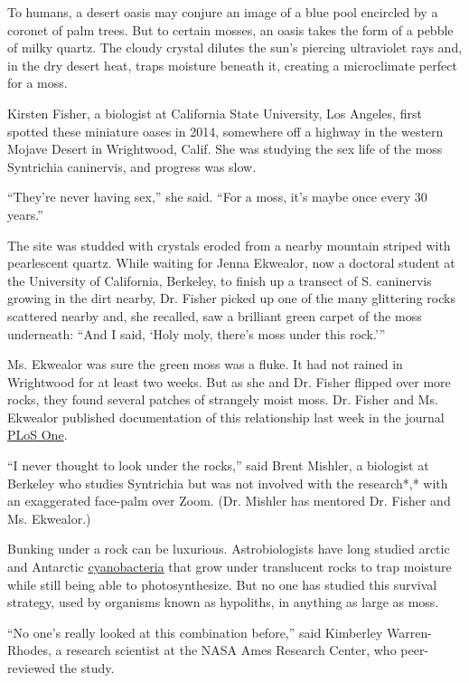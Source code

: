 To humans, a desert oasis may conjure an image of a blue pool encircled
by a coronet of palm trees. But to certain mosses, an oasis takes the
form of a pebble of milky quartz. The cloudy crystal dilutes the sun's
piercing ultraviolet rays and, in the dry desert heat, traps moisture
beneath it, creating a microclimate perfect for a moss.

Kirsten Fisher, a biologist at California State University, Los Angeles,
first spotted these miniature oases in 2014, somewhere off a highway in
the western Mojave Desert in Wrightwood, Calif. She was studying the sex
life of the moss Syntrichia caninervis, and progress was slow.

``They're never having sex,'' she said. ``For a moss, it's maybe once
every 30 years.''

The site was studded with crystals eroded from a nearby mountain striped
with pearlescent quartz. While waiting for Jenna Ekwealor, now a
doctoral student at the University of California, Berkeley, to finish up
a transect of S. caninervis growing in the dirt nearby, Dr. Fisher
picked up one of the many glittering rocks scattered nearby and, she
recalled, saw a brilliant green carpet of the moss underneath: ``And I
said, `Holy moly, there's moss under this rock.'''

Ms. Ekwealor was sure the green moss was a fluke. It had not rained in
Wrightwood for at least two weeks. But as she and Dr. Fisher flipped
over more rocks, they found several patches of strangely moist moss. Dr.
Fisher and Ms. Ekwealor published documentation of this relationship
last week in the journal
\href{https://journals.plos.org/plosone/article?id=10.1371/journal.pone.0235928}{PLoS
One}.

``I never thought to look under the rocks,'' said Brent Mishler, a
biologist at Berkeley who studies Syntrichia but was not involved with
the research*,* with an exaggerated face-palm over Zoom. (Dr. Mishler
has mentored Dr. Fisher and Ms. Ekwealor.)

Bunking under a rock can be luxurious. Astrobiologists have long studied
arctic and Antarctic
\href{https://www.nature.com/articles/431414a}{cyanobacteria} that grow
under translucent rocks to trap moisture while still being able to
photosynthesize. But no one has studied this survival strategy, used by
organisms known as hypoliths, in anything as large as moss.

``No one's really looked at this combination before,'' said Kimberley
Warren-Rhodes, a research scientist at the NASA Ames Research Center,
who peer-reviewed the study.

